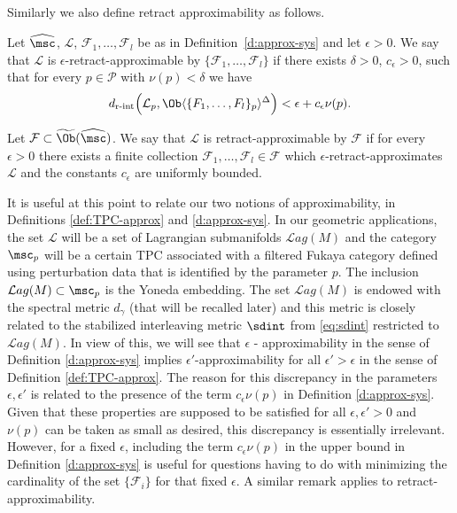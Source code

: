 Similarly we also define retract approximability as follows. 
\begin{dfn} \label{d:approx-sys-ret} Let $\widehat{\msc}$,
  $\mathcal{L}$, $\mathcal{F}_1, \ldots, \mathcal{F}_l$ be as in
  Definition~\ref{d:approx-sys} and let $\epsilon>0$. We say that
  $\mathcal{L}$ is $\epsilon$-retract-approximable by
  $\{\mathcal{F}_1, \ldots, \mathcal{F}_l\}$ if there exists
  $\delta>0$, $c_{\epsilon}>0$, such that for every $p \in \mathcal{P}$ with
  $\nu(p) < \delta$ we have
  $${d}_{\text{r-int}} \Bigl(\mathcal{L}_p,
  \Ob \langle \{F_1, \ldots, F_l\}_p \rangle^{\Delta} \Bigr)
  < \epsilon +c_{\epsilon}\nu(p).$$

  Let $\mathcal{F} \subset \widetilde{\Ob}(\widehat{\msc})$. We say
  that $\mathcal{L}$ is retract-approximable by $\mathcal{F}$ if for
  every $\epsilon>0$ there exists a finite collection
  $\mathcal{F}_1, \ldots, \mathcal{F}_l \in \mathcal{F}$ which
  $\epsilon$-retract-approximates $\mathcal{L}$ and the constants
  $c_{\epsilon}$ are uniformly bounded.
\end{dfn}

\begin{rem}\label{rem:different_approx} It is useful at this point to
  relate our two notions of approximability, in Definitions
  \ref{def:TPC-approx} and \ref{d:approx-sys}.  In our geometric
  applications, the set $\mathcal{L}$ will be a set of Lagrangian
  submanifolds $\mathcal{L}ag(M)$ and the category $\msc_{p}$ will be
  a certain TPC associated with a filtered Fukaya category defined using
  perturbation data that is identified by the parameter $p$.  The
  inclusion $\mathcal{L}ag(M)\subset \msc_{p}$ is the Yoneda
  embedding. The set $\mathcal{L}ag(M)$ is endowed with the spectral
  metric $d_{\gamma}$ (that will be recalled later) and this metric is
  closely related to the stabilized interleaving metric $\sdint$ from
  \eqref{eq:sdint} restricted to $\mathcal{L}ag(M)$.  In view of this,
  we will see that $\epsilon$ - approximability in the sense of
  Definition \ref{d:approx-sys} implies $\epsilon'$-approximability
  for all $\epsilon'>\epsilon$ in the sense of Definition
  \ref{def:TPC-approx}. The reason for this discrepancy in the
  parameters $\epsilon,\epsilon'$ is related to the presence of the
  term $c_{\epsilon}\nu(p)$ in Definition \ref{d:approx-sys}.  Given
  that these properties are supposed to be satisfied for all
  $\epsilon,\epsilon' >0$ and $\nu(p)$ can be taken as small as
  desired, this discrepancy is essentially irrelevant. However, for a
  fixed $\epsilon$, including the term $c_{\epsilon} \nu(p)$ in the
  upper bound in Definition \ref{d:approx-sys} is useful for questions
  having to do with minimizing the cardinality of the set
  $\{\mathcal{F}_{i}\}$ for that fixed $\epsilon$.  A similar remark
  applies to retract-approximability.
\end{rem}

